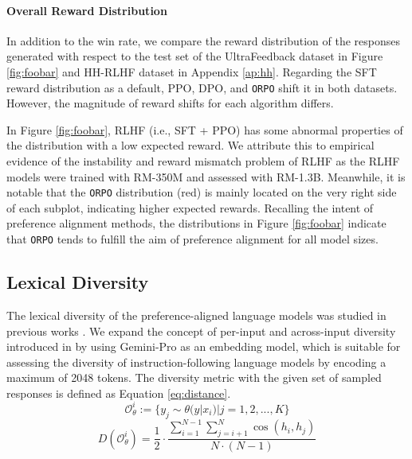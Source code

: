 \paragraph{Overall Reward Distribution} In addition to the win rate, we compare the reward distribution of the responses generated with respect to the test set of the UltraFeedback dataset in Figure \ref{fig:foobar} and HH-RLHF dataset in Appendix \ref{ap:hh}. Regarding the SFT reward distribution as a default, PPO, DPO, and \texttt{ORPO} shift it in both datasets. However, the magnitude of reward shifts for each algorithm differs.

In Figure \ref{fig:foobar}, RLHF (i.e., SFT + PPO) has some abnormal properties of the distribution with a low expected reward. We attribute this to empirical evidence of the instability and reward mismatch problem of RLHF \citep{rafailov2023direct, gao2022scaling, shen-etal-2023-loose} as the RLHF models were trained with RM-350M and assessed with RM-1.3B. Meanwhile, it is notable that the \texttt{ORPO} distribution (red) is mainly located on the very right side of each subplot, indicating higher expected rewards. Recalling the intent of preference alignment methods, the distributions in Figure \ref{fig:foobar} indicate that \texttt{ORPO} tends to fulfill the aim of preference alignment for all model sizes.

\subsection{Lexical Diversity}\label{subsec:div}

The lexical diversity of the preference-aligned language models was studied in previous works \citep{kirk2024understanding}. We expand the concept of per-input and across-input diversity introduced in \citet{kirk2024understanding} by using Gemini-Pro \citep{team2023gemini} as an embedding model, which is suitable for assessing the diversity of instruction-following language models by encoding a maximum of 2048 tokens. The diversity metric with the given set of sampled responses is defined as Equation \ref{eq:distance}.
\begin{equation}
    \mathcal{O}_\theta^i := \{y_j \sim \theta(y|x_i) | j = 1, 2, ..., K \}\label{eq:set}
\end{equation}
\begin{equation}
    D(\mathcal{O}^i_\theta) = \frac{1}{2} \cdot \frac{\sum_{i=1}^{N-1} \sum_{j=i+1}^{N} \cos(h_i, h_j)}{N \cdot (N-1)}\label{eq:distance}
\end{equation}

